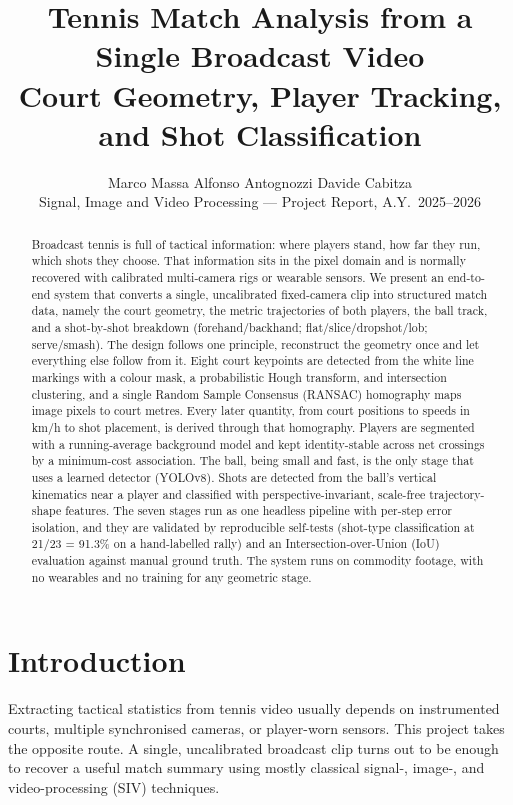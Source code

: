 \documentclass[11pt]{article}
\title{\vspace{-1.0cm}\bfseries Tennis Match Analysis from a Single Broadcast Video\\[3pt]
\large Court Geometry, Player Tracking, and Shot Classification}
\author{Marco Massa \quad Alfonso Antognozzi \quad Davide Cabitza\\[3pt]
\normalsize Signal, Image and Video Processing --- Project Report, A.Y.~2025--2026}
\date{}
\begin{document}
\maketitle

\begin{abstract}
\noindent
Broadcast tennis is full of tactical information: where players stand, how far they run, which shots they choose. That information sits in the pixel domain and is normally recovered with calibrated multi-camera rigs or wearable sensors. We present an end-to-end system that converts a single, uncalibrated fixed-camera clip into structured match data, namely the court geometry, the metric trajectories of both players, the ball track, and a shot-by-shot breakdown (forehand/backhand; flat/slice/dropshot/lob; serve/smash). The design follows one principle, reconstruct the geometry once and let everything else follow from it. Eight court keypoints are detected from the white line markings with a colour mask, a probabilistic Hough transform, and intersection clustering, and a single Random Sample Consensus (RANSAC) homography maps image pixels to court metres. Every later quantity, from court positions to speeds in km/h to shot placement, is derived through that homography. Players are segmented with a running-average background model and kept identity-stable across net crossings by a minimum-cost association. The ball, being small and fast, is the only stage that uses a learned detector (YOLOv8). Shots are detected from the ball's vertical kinematics near a player and classified with perspective-invariant, scale-free trajectory-shape features. The seven stages run as one headless pipeline with per-step error isolation, and they are validated by reproducible self-tests (shot-type classification at 21/23 = 91.3\% on a hand-labelled rally) and an Intersection-over-Union (IoU) evaluation against manual ground truth. The system runs on commodity footage, with no wearables and no training for any geometric stage.
\end{abstract}

\section{Introduction}
Extracting tactical statistics from tennis video usually depends on instrumented courts, multiple synchronised cameras, or player-worn sensors. This project takes the opposite route. A single, uncalibrated broadcast clip turns out to be enough to recover a useful match summary using mostly classical signal-, image-, and video-processing (SIV) techniques.
\end{document}
